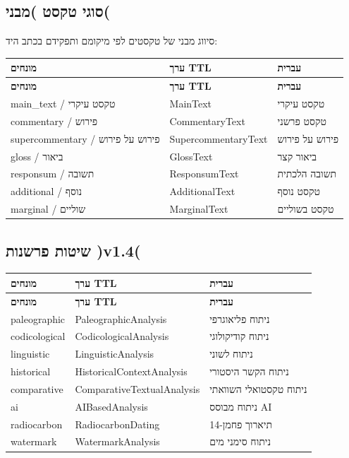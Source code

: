 \documentclass[12pt,a4paper]{article}
\begin{document}
\subsection{סוגי טקסט )מבני(}

סיווג מבני של טקסטים לפי מיקומם ותפקידם בכתב היד:

\begin{longtable}{|p{4cm}|L{5cm}|L{7cm}|}
\hline
\textbf{מונחים} & \textbf{ערך TTL} & \textbf{עברית} \\
\hline
\endfirsthead
\hline
\textbf{מונחים} & \textbf{ערך TTL} & \textbf{עברית} \\
\hline
\endhead
\hline
\endfoot
main\_text / טקסט עיקרי & MainText & טקסט עיקרי \\
\hline
commentary / פירוש & CommentaryText & טקסט פרשני \\
\hline
supercommentary / פירוש על פירוש & SupercommentaryText & פירוש על פירוש \\
\hline
gloss / ביאור & GlossText & ביאור קצר \\
\hline
responsum / תשובה & ResponsumText & תשובה הלכתית \\
\hline
additional / נוסף & AdditionalText & טקסט נוסף \\
\hline
marginal / שוליים & MarginalText & טקסט בשוליים \\
\hline
\end{longtable}

\subsection{שיטות פרשנות )v1.4(}

\begin{longtable}{|p{4cm}|L{5cm}|L{7cm}|}
\hline
\textbf{מונחים} & \textbf{ערך TTL} & \textbf{עברית} \\
\hline
\endfirsthead
\hline
\textbf{מונחים} & \textbf{ערך TTL} & \textbf{עברית} \\
\hline
\endhead
\hline
\endfoot
paleographic & PaleographicAnalysis & ניתוח פליאוגרפי \\
\hline
codicological & CodicologicalAnalysis & ניתוח קודיקולוגי \\
\hline
linguistic & LinguisticAnalysis & ניתוח לשוני \\
\hline
historical & HistoricalContextAnalysis & ניתוח הקשר היסטורי \\
\hline
comparative & ComparativeTextualAnalysis & ניתוח טקסטואלי השוואתי \\
\hline
ai & AIBasedAnalysis & ניתוח מבוסס AI \\
\hline
radiocarbon & RadiocarbonDating & תיארוך פחמן-14 \\
\hline
watermark & WatermarkAnalysis & ניתוח סימני מים \\
\hline
\end{longtable}
\end{document}
